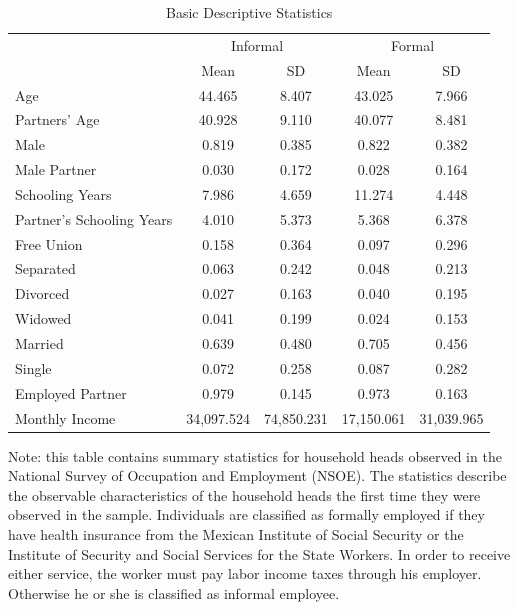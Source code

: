 \documentclass{svjour3}                     %
\begin{document}
\begin{table}[H] 
\begin{threeparttable}
\caption{Basic Descriptive Statistics}
\label{table:summary2}
\centering 
\tiny
\begin{tabular}{lcccc} \hline \hline
 & \multicolumn{2}{c}{Informal} & \multicolumn{2}{c}{Formal} \\ 
 & Mean  & SD  & Mean  & SD  \\  \hline 
Age &    44.465 &     8.407 &    43.025 &     7.966 \\  
Partners' Age &    40.928 &     9.110 &    40.077 &     8.481 \\  
Male &     0.819 &     0.385 &     0.822 &     0.382 \\  
Male Partner &     0.030 &     0.172 &     0.028 &     0.164 \\  
Schooling Years &     7.986 &     4.659 &    11.274 &     4.448 \\  
Partner's Schooling Years &     4.010 &     5.373 &     5.368 &     6.378 \\  
Free Union &     0.158 &     0.364 &     0.097 &     0.296 \\  
Separated &     0.063 &     0.242 &     0.048 &     0.213 \\  
Divorced &     0.027 &     0.163 &     0.040 &     0.195 \\  
Widowed &     0.041 &     0.199 &     0.024 &     0.153 \\  
Married &     0.639 &     0.480 &     0.705 &     0.456 \\  
Single &     0.072 &     0.258 &     0.087 &     0.282 \\  
Employed Partner &     0.979 &     0.145 &     0.973 &     0.163 \\   
Monthly Income & 34,097.524 & 74,850.231 & 17,150.061 & 31,039.965 \\  
\hline \hline \end{tabular}\begin{tablenotes}[flushleft]
\tiny
\item Note: this table contains summary statistics for household heads observed in the National Survey of Occupation and Employment (NSOE). The statistics describe the observable characteristics of the household heads the first time they were observed in the sample. Individuals are classified as formally employed if they have health insurance from the Mexican Institute of Social Security or the Institute of Security and Social Services for the State Workers. In order to receive either service, the worker must pay labor income taxes through his employer. Otherwise he or she is classified as informal employee.\\
\end{tablenotes}
\end{threeparttable}
\end{table}
\end{document}
